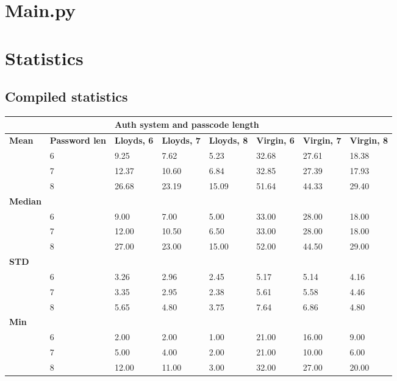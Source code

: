 \documentclass[british,11pt,a4paper]{article}
\begin{document}
\begin{appendices}
	\section{Main.py}\label{app:main}
		
	\clearpage
	
	\section{Statistics}\label{app:extra_stats}
	\subsection{Compiled statistics}
	\begin{table}[!htb]
		\centering
		\begin{tabular}{|l|l|l|l|l|l|l|l|}
		\hline
		& & \multicolumn{6}{l|}{\textbf{Auth system and passcode length}} \\ \hline
		\textbf{Mean} & \textbf{Password len} & \textbf{Lloyds, 6} & \textbf{Lloyds, 7} & \textbf{Lloyds, 8} & \textbf{Virgin, 6} & \textbf{Virgin, 7} & \textbf{Virgin, 8} \\ \hline
		 & 6 & 9.25 & 7.62 & 5.23 & 32.68 & 27.61 & 18.38 \\ \hline
		 & 7 & 12.37 & 10.60 & 6.84 & 32.85 & 27.39 & 17.93 \\ \hline
		 & 8 & 26.68 & 23.19 & 15.09 & 51.64 & 44.33 & 29.40 \\ \hline
		\textbf{Median} &  &  &  &  &  &  &  \\ \hline
		 & 6 & 9.00 & 7.00 & 5.00 & 33.00 & 28.00 & 18.00 \\ \hline
		 & 7 & 12.00 & 10.50 & 6.50 & 33.00 & 28.00 & 18.00 \\ \hline
		 & 8 & 27.00 & 23.00 & 15.00 & 52.00 & 44.50 & 29.00 \\ \hline
		\textbf{STD} &  &  &  &  &  &  &  \\ \hline
		 & 6 & 3.26 & 2.96 & 2.45 & 5.17 & 5.14 & 4.16 \\ \hline
		 & 7 & 3.35 & 2.95 & 2.38 & 5.61 & 5.58 & 4.46 \\ \hline
		 & 8 & 5.65 & 4.80 & 3.75 & 7.64 & 6.86 & 4.80 \\ \hline
		\textbf{Min} &  &  &  &  &  &  &  \\ \hline
		 & 6 & 2.00 & 2.00 & 1.00 & 21.00 & 16.00 & 9.00 \\ \hline
		 & 7 & 5.00 & 4.00 & 2.00 & 21.00 & 10.00 & 6.00 \\ \hline
		 & 8 & 12.00 & 11.00 & 3.00 & 32.00 & 27.00 & 20.00 \\ \hline

\end{tabular}
\end{table}
\end{appendices}
\end{document}
